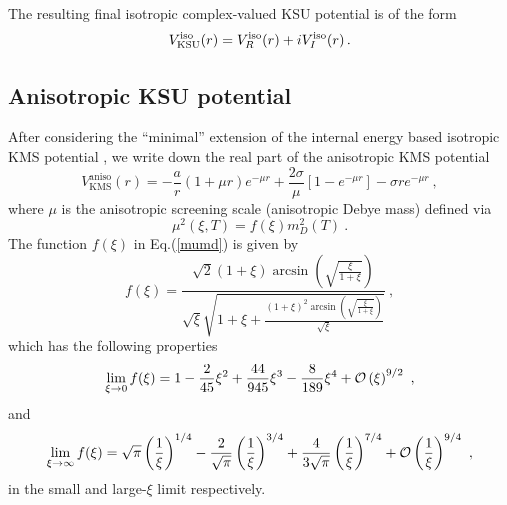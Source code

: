 \documentclass[times,sort&compress,final]{elsarticle}
\begin{document}
The resulting final isotropic complex-valued KSU potential is of the form 
%
\begin{equation}
V^{\rm iso}_{\rm KSU} (r) = V^{\rm iso}_R (r) + i V^{\rm iso}_I (r) \, .
\end{equation}
%

\subsection{Anisotropic KSU potential}
\label{sec:anisoksupotential}

After considering the ``minimal'' extension \cite{Dumitru:2009ni} of the internal energy based isotropic KMS potential \cite{Karsch:1987pv,Strickland:2011aa}, we write down the real part of the anisotropic KMS potential
%
\begin{equation}
V^{\mathrm{aniso}}_{\mathrm{KMS}}(r)=-\frac{a}{r}(1+\mu r)e^{-\mu r}+\frac{2\sigma}{\mu}\left[1-e^{-\mu r}\right]-\sigma r e^{-\mu r} ~,
\end{equation}
%
where $\mu$ is the anisotropic screening scale (anisotropic Debye mass) defined via
%
\begin{equation}
\mu^2(\xi, T) = f(\xi) m^2_D(T) ~.\label{mumd}
\end{equation}
%
The function $f(\xi)$ in Eq.(\ref{mumd}) is given by \cite{Strickland:2018ayk} 
%
\begin{equation}
f(\xi)=\frac{\sqrt{2}(1+\xi)\arcsin{\left(\sqrt{\frac{\xi}{1+\xi}}\right)}}{\sqrt{\xi}\sqrt{1+\xi+\frac{(1+\xi)^2 \arcsin{\left(\sqrt{\frac{\xi}{1+\xi}}\right)}}{\sqrt{\xi}}}}~,\label{ffunc}
\end{equation}
%
which has the following properties
%
\begin{equation}
\lim_{\xi \rightarrow 0}f(\xi) = 1-\frac{2}{45}\xi^2 + \frac{44}{945}\xi^3 - \frac{8}{189}\xi^4 + {\cal O}\left(\xi\right)^{9/2}~,
\end{equation}
%
and
%
\begin{equation}
\lim_{\xi \rightarrow \infty}f(\xi) = \sqrt{\pi}\left(\frac{1}{\xi}\right)^{1/4} - \frac{2}{\sqrt{\pi}}\left(\frac{1}{\xi}\right)^{3/4} + \frac{4}{3\sqrt{\pi}}\left(\frac{1}{\xi}\right)^{7/4} + {\cal O}\left(\frac{1}{\xi}\right)^{9/4}~,
\end{equation}
%
in the small and large-$\xi$ limit respectively.
\end{document}
